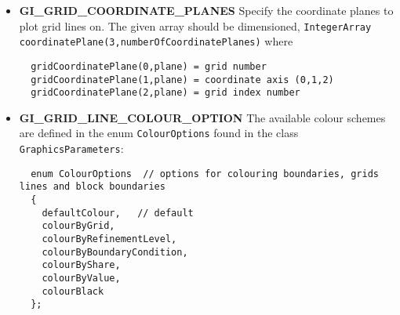 \documentclass{article}
\begin{document}
\begin{itemize}
 \item{\bf GI\_GRID\_COORDINATE\_PLANES} Specify the coordinate planes to plot grid lines on. The given array should be
    dimensioned, {\tt IntegerArray coordinatePlane(3,numberOfCoordinatePlanes)} where
\begin{verbatim}
  gridCoordinatePlane(0,plane) = grid number
  gridCoordinatePlane(1,plane) = coordinate axis (0,1,2)
  gridCoordinatePlane(2,plane) = grid index number 
\end{verbatim}

 \item{\bf GI\_GRID\_LINE\_COLOUR\_OPTION} The available colour schemes are defined in the enum 
    {\tt ColourOptions} found in the class {\tt GraphicsParameters}:
\begin{verbatim}
  enum ColourOptions  // options for colouring boundaries, grids lines and block boundaries
  { 
    defaultColour,   // default 
    colourByGrid,
    colourByRefinementLevel,
    colourByBoundaryCondition,
    colourByShare,
    colourByValue,
    colourBlack
  };
\end{verbatim}


\end{itemize}
\end{document}
